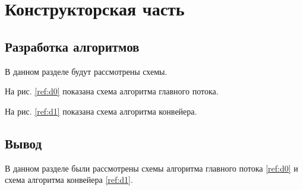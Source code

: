\chapter{Конструкторская часть}
\label{cha:design}

\section{Разработка алгоритмов}

В данном разделе будут рассмотрены схемы.

На рис. \ref{ref:d0} показана схема алгоритма главного потока.

\begin{figure}[ht!]
\end{figure}

На рис. \ref{ref:d1} показана схема алгоритма конвейера.

\begin{figure}[ht!]
\end{figure}

\section{Вывод}

В данном разделе были рассмотрены схемы алгоритма главного потока \ref{ref:d0}
и схема алгоритма конвейера \ref{ref:d1}.






